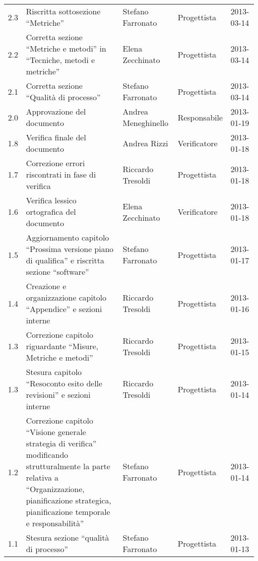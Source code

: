 \begin{longtable}{lp{}lll}
2.3 & Riscritta sottosezione ``Metriche''  & Stefano Farronato &Progettista  & 2013-03-14\\
2.2 & Corretta sezione ``Metriche e metodi'' in ``Tecniche, metodi e metriche'' & Elena Zecchinato &Progettista & 2013-03-14\\
2.1 & Corretta sezione ``Qualità di processo'' & Stefano Farronato &Progettista & 2013-03-14\\
2.0 & Approvazione del documento& Andrea Meneghinello &Responsabile & 2013-01-19\\
1.8 & Verifica finale del documento& Andrea Rizzi &Verificatore & 2013-01-18\\
1.7 & Correzione errori riscontrati in fase di verifica& Riccardo Tresoldi &Progettista & 2013-01-18\\
1.6 & Verifica lessico ortografica del documento& Elena Zecchinato &Verificatore & 2013-01-18\\
1.5 & Aggiornamento capitolo ``Prossima versione piano di qualifica'' e riscritta sezione ``software''& Stefano Farronato &Progettista & 2013-01-17\\
1.4 & Creazione e organizzazione capitolo ``Appendice'' e sezioni interne &Riccardo Tresoldi &Progettista & 2013-01-16\\
1.3 & Correzione capitolo riguardante ``Misure, Metriche e metodi'' &Riccardo Tresoldi &Progettista & 2013-01-15\\
1.3 & Stesura capitolo ``Resoconto esito delle revisioni'' e sezioni interne &Riccardo Tresoldi &Progettista & 2013-01-14\\
1.2 & Correzione capitolo ``Visione generale strategia di verifica'' modificando strutturalmente la parte relativa a ``Organizzazione, pianificazione strategica, pianificazione temporale e responsabilità''&Stefano Farronato &Progettista & 2013-01-14\\
1.1 & Stesura sezione ``qualità di processo'' & Stefano Farronato &Progettista & 2013-01-13\\


\end{longtable}
